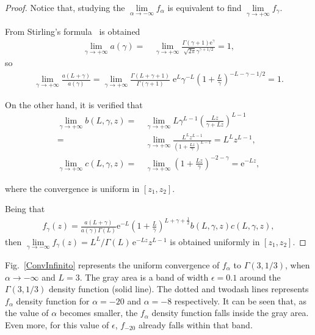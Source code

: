 \documentclass[technote,onecolumn,draftcls,12pt]{IEEEtran}
\numberwithin{equation}{section}
\newenvironment{dem}[1][Proof]{\begin{proof}[{\it #1}]}{\end{proof}}
\newcommand{\e}{\mathrm{e}}
\newcommand{\al}{&\,}
\newcommand{\pa}[1]{\ensuremath{\left( #1 \right)}}
\begin{document}
\begin{dem}
	Notice that, studying the $\lim\limits_{\alpha\to-\infty} f_{\alpha}$ is equivalent to find
	$\lim\limits_{\gamma\to+\infty} f_{\gamma}.$

	
From Stirling's formula~\cite{abramowitz1964} is obtained
\begin{align*}
\lim_{\gamma\to+\infty} a\pa{\gamma} = 
\al \lim_{\gamma\to+\infty}\frac{\Gamma\pa{\gamma+1}\e^{\gamma}}{\sqrt{2\pi}\gamma^{\gamma+1/2}} = 1,
\end{align*}
so
\begin{align*}
\lim_{\gamma\to+\infty} \frac{a\pa{L+\gamma}}{a\pa{\gamma}} = 
\lim_{\gamma\to+\infty}\frac{\Gamma({L+\gamma+1})}{\Gamma\pa{\gamma+1}}
 \; \e^{L}\gamma^{-L}\left({1+\frac{L}{\gamma}}\right)^{-L-\gamma-1/2}
= 1.
\end{align*}

On the other hand, it is verified that
\begin{align*}
\lim_{\gamma\to+\infty} b\pa{L,\gamma,z} =
\al \lim_{\gamma\to+\infty}L\gamma^{L-1}\pa{\frac{Lz}{\gamma+Lz}}^{L-1} \\
= \al \lim_{\gamma\to+\infty} \frac{L^{L} z^{L-1}}{\pa{1+\frac{Lz}{\gamma}}^{L-1}} = L^{L} z^{L-1},\\
\lim_{\gamma\to+\infty} c\pa{L,\gamma,z} = \al \lim_{\gamma\to+\infty}\pa{1+\frac{Lz}{\gamma}}^{-2-\gamma} = \e^{-Lz},
\end{align*}
	
where the convergence is uniform in $[z_{1},z_{2}]$.
	
Being that
\begin{align*}
f_{\gamma}\pa{z} = \frac{a\pa{L+\gamma}}{a\pa{\gamma}\Gamma\pa{L}}\e^{-L}\pa{1+\frac{L}{\gamma}}^{L+\gamma+\frac 1 2}
b\pa{L,\gamma,z}c\pa{L,\gamma,z},
\end{align*}
	then $\lim\limits_{\gamma\to-\infty} f_{\gamma}\pa{z} = L^{L}/\Gamma\pa{L}\,\e^{-Lz}z^{L-1}$
	is obtained uniformly in $[z_{1},z_{2}]$.
\end{dem}

Fig.~\ref{ConvInfinito} represents the uniform convergence of $f_{\alpha}$ to $\Gamma(3,1/3)$, when $\alpha \to -\infty$ and $L=3$. The gray area is a band of width $\epsilon=0.1$ around the $\Gamma(3,1/3)$ density function (solid line). The dotted and twodash lines represents $f_{\alpha}$ density function for $\alpha=-20$ and $\alpha=-8$ respectively. It can be seen that, as the value of $\alpha$ becomes smaller, the $f_{\alpha}$ density function falls inside the gray area. Even more, for this value of $\epsilon$, $f_{-20}$ already falls within that band.
\end{document}

